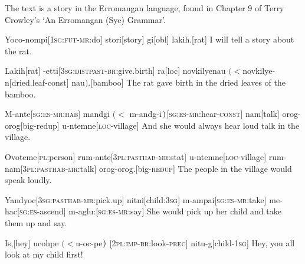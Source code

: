 \documentclass[12pt]{article}
\begin{document}
\def\@{\textipa{@}}

\hsize=5.2in

\bigskip

\noindent The text is a story in the Erromangan language, found in Chapter 9 of
Terry Crowley's `An Erromangan (Sye) Grammar'.

\exdisplay[aboveexskip=2ex]
\begingl
Yoco-nompi[\textsc{1sg:fut-mr:}do]
stori[story]
gi[\sc obl]
lakih.[rat]
\glft I will tell a story about the rat.
\endgl
{}
\xe

\exdisplay
\begingl
Lakih[rat]
-etti[\textsc{3sg:distpast-br:}give.birth]
ra[\sc loc]
{novkilyenau $(<$novkilye-n}[dried.leaf-\sc const]
nau$)$.[bamboo]
\glft The rat gave birth in the dried leaves of the bamboo.
\endgl
\xe

\exdisplay\begingl
M-ante[\textsc{sg:es-mr:hab}]
{mandgi $(<$ m-andg-i$\mskip2mu)$}[\textsc{sg:es-mr:}hear-\textsc{const}]
nam[talk]
orog-orog[big-\sc redup]
u-ntemne[\textsc{loc}-village]
\glft And she would always hear loud talk in the village.
\endgl
\xe

\exdisplay
\begingl
Ovoteme[\textsc{pl}:person]
rum-ante[\textsc{3pl:pasthab-mr:}stat]
u-ntemne[\textsc{loc}-village]
rum-nam[\textsc{3pl:pasthab-mr:}talk]
orog-orog.[big-\textsc{redup}]
\glft The people in the village would speak loudly.
\endgl
\xe

\exdisplay
{}
\begingl
Yandyoc[\textsc{3sg:pasthab-mr:}pick.up]
nitni[child:\textsc{3sg}]
m-ampai[\textsc{sg:es-mr:}take]
me-hac[\textsc{sg:es-}ascend]
m-aglu:[\textsc{sg:es-mr:}say]
\glft She would pick up her child and take them up and say.
\endgl
{}
\xe

\exdisplay
\def\schwa{{\textipa @}}%
\def\({{\rm )}}%
\begingl
Is,[hey]
{ucohpe $(<$u-oc\@h-pe$\mskip1mu )$}%
   [\textsc{2pl:imp-br:}look\textsc{-prec}]
nitu-g[child\textsc{-1sg}]
\glft Hey, you all look at my child first!
\endgl
{}

\xe
\end{document}
